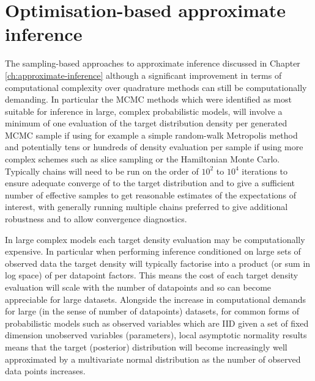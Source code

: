 \chapter{Optimisation-based approximate inference}\label{app:optimisation-based-approximate-inference}

The sampling-based approaches to approximate inference discussed in Chapter \ref{ch:approximate-inference} although a significant improvement in terms of computational complexity over quadrature methods can still be computationally demanding. In particular the \ac{MCMC} methods which were identified as most suitable for inference in large, complex probabilistic models, will involve a minimum of one evaluation of the target distribution density per generated \ac{MCMC} sample if using for example a simple random-walk Metropolis method and potentially tens or hundreds of density evaluation per sample if using more complex schemes such as slice sampling or the Hamiltonian Monte Carlo. Typically chains will need to be run on the order of $10^2$ to $10^4$ iterations to ensure adequate converge of to the target distribution and to give a sufficient number of effective samples to get reasonable estimates of the expectations of interest, with generally running multiple chains preferred to give additional robustness and to allow convergence diagnostics.

In large complex models each target density evaluation may be computationally expensive. In particular when performing inference conditioned on large sets of observed data the target density will typically factorise into a product (or sum in log space) of per datapoint factors. This means the cost of each target density evaluation will scale with the number of datapoints and so can become appreciable for large datasets. Alongside the increase in computational demands for large (in the sense of number of datapoints) datasets, for common forms of probabilistic models such as observed variables which are \ac{IID} given a set of fixed dimension unobserved variables (parameters), local asymptotic normality results means that the target (posterior) distribution will become increasingly well approximated by a multivariate normal distribution as the number of  observed data points increases. %

